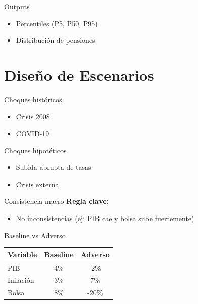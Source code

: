\documentclass{beamer}
\begin{document}
\begin{frame}{Outputs}
\begin{itemize}
\item Percentiles (P5, P50, P95)
\item Distribución de pensiones
\end{itemize}
\end{frame}

\section{Diseño de Escenarios}

\begin{frame}{Choques históricos}
\begin{itemize}
\item Crisis 2008
\item COVID-19
\end{itemize}
\end{frame}

\begin{frame}{Choques hipotéticos}
\begin{itemize}
\item Subida abrupta de tasas
\item Crisis externa
\end{itemize}
\end{frame}

\begin{frame}{Consistencia macro}
\textbf{Regla clave:}
\begin{itemize}
\item No inconsistencias (ej: PIB cae y bolsa sube fuertemente)
\end{itemize}
\end{frame}

\begin{frame}{Baseline vs Adverso}
\begin{tabular}{lcc}
\hline
Variable & Baseline & Adverso \\
\hline
PIB & 4\% & -2\% \\
Inflación & 3\% & 7\% \\
Bolsa & 8\% & -20\% \\
\hline
\end{tabular}
\end{frame}
\end{document}
